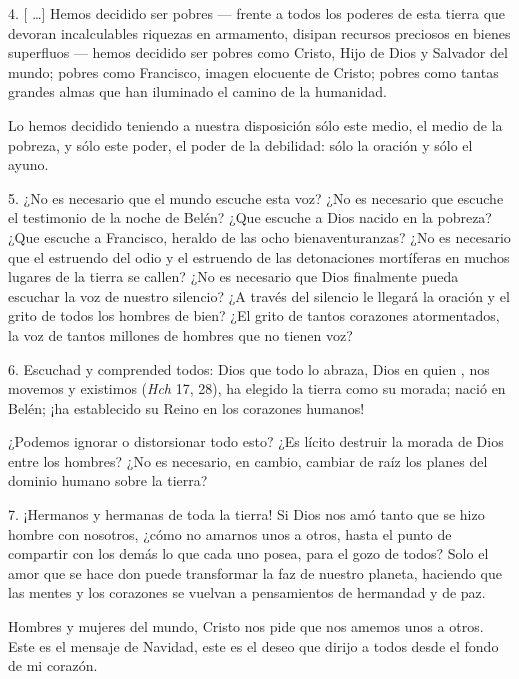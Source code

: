 \begin{body}
							4. {[} \ldots{}{]} Hemos decidido ser pobres --- frente a todos los poderes de esta tierra que devoran incalculables riquezas en armamento, disipan recursos preciosos en bienes superfluos --- hemos decidido ser pobres como Cristo, Hijo de Dios y Salvador del mundo; pobres como Francisco, imagen elocuente de Cristo; pobres como tantas grandes almas que han iluminado el camino de la humanidad.
							
							Lo hemos decidido teniendo a nuestra disposición sólo este medio, el medio de la pobreza, y sólo este poder, el poder de la debilidad: sólo la oración y sólo el ayuno.
							
							5. ¿No es necesario que el mundo escuche esta voz? ¿No es necesario que escuche el testimonio de la noche de Belén? ¿Que escuche a Dios nacido en la pobreza? ¿Que escuche a Francisco, heraldo de las ocho bienaventuranzas? ¿No es necesario que el estruendo del odio y el estruendo de las detonaciones mortíferas en muchos lugares de la tierra se callen? ¿No es necesario que Dios finalmente pueda escuchar la voz de nuestro silencio? ¿A través del silencio le llegará la oración y el grito de todos los hombres de bien? ¿El grito de tantos corazones atormentados, la voz de tantos millones de hombres que no tienen voz?
							
							6. Escuchad y comprended todos: Dios que todo lo abraza, Dios en quien , nos movemos y existimos (\emph{Hch} 17, 28), ha elegido la tierra como su morada; nació en Belén; ¡ha establecido su Reino en los corazones humanos!
							
							¿Podemos ignorar o distorsionar todo esto? ¿Es lícito destruir la morada de Dios entre los hombres? ¿No es necesario, en cambio, cambiar de raíz los planes del dominio humano sobre la tierra?
							
							7. ¡Hermanos y hermanas de toda la tierra! Si Dios nos amó tanto que se hizo hombre con nosotros, ¿cómo no amarnos unos a otros, hasta el punto de compartir con los demás lo que cada uno posea, para el gozo de todos? Solo el amor que se hace don puede transformar la faz de nuestro planeta, haciendo que las mentes y los corazones se vuelvan a pensamientos de hermandad y de paz.
							
							Hombres y mujeres del mundo, Cristo nos pide que nos amemos unos a otros. Este es el mensaje de Navidad, este es el deseo que dirijo a todos desde el fondo de mi corazón.
						\end{body}

